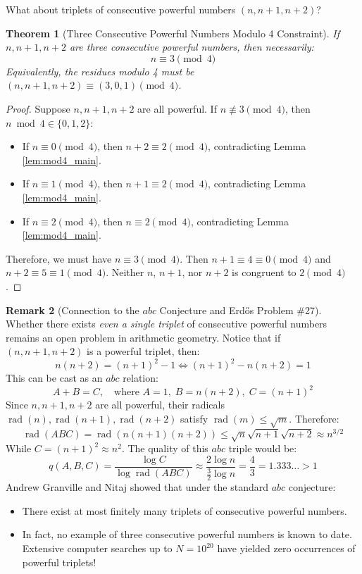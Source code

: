 \documentclass[11pt,a4paper]{article}
\newtheorem{theorem}{Theorem}[section]
\theoremstyle{definition}
\newtheorem{remark}[theorem]{Remark}
\begin{document}
What about triplets of consecutive powerful numbers $(n, n+1, n+2)$?

\begin{theorem}[Three Consecutive Powerful Numbers Modulo 4 Constraint]\label{thm:three_mod4_cond}
If $n, n+1, n+2$ are three consecutive powerful numbers, then necessarily:
\begin{equation}\label{eq:mod4_req}
n \equiv 3 \pmod 4
\end{equation}
Equivalently, the residues modulo 4 must be $(n, n+1, n+2) \equiv (3, 0, 1) \pmod 4$.
\end{theorem}

\begin{proof}
Suppose $n, n+1, n+2$ are all powerful.
If $n \not\equiv 3 \pmod 4$, then $n \bmod 4 \in \{0, 1, 2\}$:
\begin{itemize}
    \item If $n \equiv 0 \pmod 4$, then $n+2 \equiv 2 \pmod 4$, contradicting Lemma \ref{lem:mod4_main}.
    \item If $n \equiv 1 \pmod 4$, then $n+1 \equiv 2 \pmod 4$, contradicting Lemma \ref{lem:mod4_main}.
    \item If $n \equiv 2 \pmod 4$, then $n \equiv 2 \pmod 4$, contradicting Lemma \ref{lem:mod4_main}.
\end{itemize}
Therefore, we must have $n \equiv 3 \pmod 4$.
Then $n+1 \equiv 4 \equiv 0 \pmod 4$ and $n+2 \equiv 5 \equiv 1 \pmod 4$.
Neither $n$, $n+1$, nor $n+2$ is congruent to $2 \pmod 4$.
\end{proof}

\begin{remark}[Connection to the $abc$ Conjecture and Erd\H{o}s Problem \#27]
Whether there exists \emph{even a single triplet} of consecutive powerful numbers remains an open problem in arithmetic geometry.
Notice that if $(n, n+1, n+2)$ is a powerful triplet, then:
\[ n(n+2) = (n+1)^2 - 1 \iff (n+1)^2 - n(n+2) = 1 \]
This can be cast as an $abc$ relation:
\[ A + B = C, \quad \text{where } A = 1, \; B = n(n+2), \; C = (n+1)^2 \]
Since $n, n+1, n+2$ are all powerful, their radicals $\operatorname{rad}(n), \operatorname{rad}(n+1), \operatorname{rad}(n+2)$ satisfy $\operatorname{rad}(m) \le \sqrt{m}$.
Therefore:
\[ \operatorname{rad}(A B C) = \operatorname{rad}(n(n+1)(n+2)) \le \sqrt{n} \sqrt{n+1} \sqrt{n+2} \approx n^{3/2} \]
While $C = (n+1)^2 \approx n^2$.
The quality of this $abc$ triple would be:
\[ q(A, B, C) = \frac{\log C}{\log \operatorname{rad}(A B C)} \approx \frac{2 \log n}{\frac{3}{2} \log n} = \frac{4}{3} = 1.333\dots > 1 \]
Andrew Granville \cite{granville1998} and Nitaj \cite{nitaj1995} showed that under the standard $abc$ conjecture:
\begin{itemize}
    \item There exist at most finitely many triplets of consecutive powerful numbers.
    \item In fact, no example of three consecutive powerful numbers is known to date. Extensive computer searches up to $N = 10^{20}$ have yielded zero occurrences of powerful triplets!
\end{itemize}
\end{remark}
\end{document}

